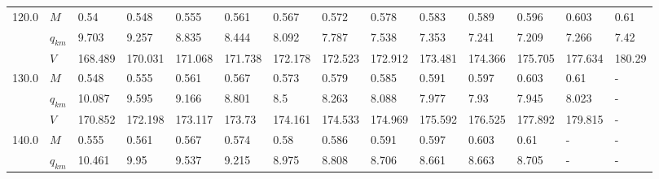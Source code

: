 \begin{tabular}{|l|l|llllllllllll|}
\hline
120.0 & $M$ &     0.54 &    0.548 &    0.555 &                     0.561 &                     0.567 &                     0.572 &                     0.578 &                     0.583 &                     0.589 &    0.596\cellcolor{green} &                     0.603 &                      0.61 \\
      & $q_{km}$ &    9.703 &    9.257 &    8.835 &                     8.444 &                     8.092 &                     7.787 &                     7.538 &                     7.353 &                     7.241 &    7.209\cellcolor{green} &                     7.266 &                      7.42 \\
      & $V$ &  168.489 &  170.031 &  171.068 &                   171.738 &                   172.178 &                   172.523 &                   172.912 &                   173.481 &                   174.366 &  175.705\cellcolor{green} &                   177.634 &                    180.29 \\
\hline
130.0 & $M$ &    0.548 &    0.555 &    0.561 &                     0.567 &                     0.573 &                     0.579 &                     0.585 &                     0.591 &    0.597\cellcolor{green} &                     0.603 &                      0.61 &                         - \\
      & $q_{km}$ &   10.087 &    9.595 &    9.166 &                     8.801 &                       8.5 &                     8.263 &                     8.088 &                     7.977 &     7.93\cellcolor{green} &                     7.945 &                     8.023 &                         - \\
      & $V$ &  170.852 &  172.198 &  173.117 &                    173.73 &                   174.161 &                   174.533 &                   174.969 &                   175.592 &  176.525\cellcolor{green} &                   177.892 &                   179.815 &                         - \\
\hline
140.0 & $M$ &    0.555 &    0.561 &    0.567 &                     0.574 &                      0.58 &                     0.586 &                     0.591 &    0.597\cellcolor{green} &                     0.603 &                      0.61 &                         - &                         - \\
      & $q_{km}$ &   10.461 &     9.95 &    9.537 &                     9.215 &                     8.975 &                     8.808 &                     8.706 &    8.661\cellcolor{green} &                     8.663 &                     8.705 &                         - &                         - \\

\end{tabular}
